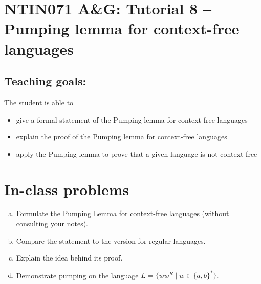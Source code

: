 \documentclass[a4paper,12pt]{amsart}
\begin{document}
\thispagestyle{empty}

\section*{NTIN071 A\&G: Tutorial 8 -- Pumping lemma for context-free languages}

\medskip

\subsection*{Teaching goals:} The student is able to

\begin{itemize}\setlength{\itemsep}{0pt}
    \item give a formal statement of the Pumping lemma for context-free languages
    \item explain the proof of the Pumping lemma for context-free languages
    \item apply the Pumping lemma to prove that a given language is not context-free
\end{itemize}


\section*{In-class problems}



\medskip\begin{problem}
    
    \begin{enumerate}[(a)]\setlength\itemsep{6pt}
        \item Formulate the Pumping Lemma for context-free languages (without consulting your notes).
        \item Compare the statement to the version for regular languages. 
        \item Explain the idea behind its proof.
        \item Demonstrate pumping on the language $L=\{ww^R\mid w\in \{a,b\}^*\}$.
    \end{enumerate}

\end{problem}
\end{document}
